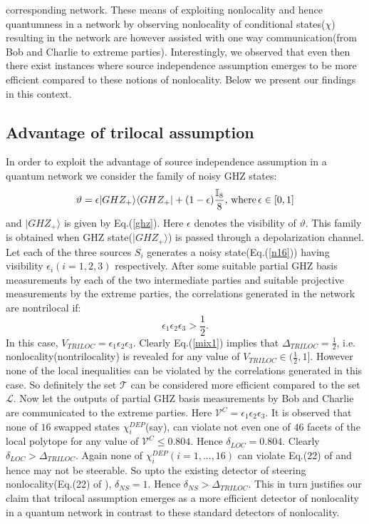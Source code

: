 \documentclass[pra,10pt,twocolumn,superscriptaddress,floatfix,showpacs]{revtex4-1}
\begin{document}
corresponding network. These means of exploiting nonlocality and hence quantumness in a network by observing nonlocality of conditional states($\chi$) resulting in the network are however assisted with one way communication(from Bob and Charlie to extreme parties). Interestingly, we observed that even then there  exist instances where source independence assumption emerges to be more efficient compared to these notions of nonlocality. Below we present our findings in this context.
\subsection{Advantage of trilocal assumption}
In order to exploit the advantage of source independence assumption in a quantum network we consider the family of noisy GHZ states:
\begin{equation}\label{n16}
\vartheta=\epsilon  |GHZ_+\rangle\langle GHZ_+|+(1-\epsilon)\frac{\mathbb{I}_8}{8},\,\textmd{where}\,\epsilon\in[0,1]
\end{equation}
and $|GHZ_+\rangle$ is given by Eq.(\ref{ghz}). Here $\epsilon$ denotes the visibility of $\vartheta$.
This family is obtained when GHZ state($|GHZ_+\rangle$) is passed through a depolarization channel\cite{NIE,BEN,BNN,BRS}. Let each of the three sources $S_i$ generates a noisy state(Eq.(\ref{n16})) having visibility $\epsilon_i(i=1,2,3)$ respectively. After some suitable partial GHZ basis measurements by each of the two intermediate parties and suitable projective measurements by the extreme parties, the correlations generated in the  network are nontrilocal if:
 \begin{equation}\label{mix1}
    \epsilon_1\epsilon_2\epsilon_3>\frac{1}{2}.
 \end{equation}
 In this case, $V_{TRILOC}= \epsilon_1\epsilon_2\epsilon_3$. Clearly Eq.(\ref{mix1}) implies that $\Delta_{TRILOC}=\frac{1}{2}$, i.e. nonlocality(nontrilocality) is revealed for any value of  $V_{TRILOC}\in(\frac{1}{2},1]$. However none of the local inequalities can be violated by the correlations generated in this case. So definitely the set $\mathcal{T}$ can be considered more efficient compared to the set $\mathcal{L}.$ Now let the outputs of partial GHZ basis measurements by Bob and Charlie are communicated to the extreme parties. Here $\mathcal{V}^C=\epsilon_1\epsilon_2\epsilon_3$. It is observed that none of  $16$ swapped states $\chi_i^{DEP}$(say), can violate\cite{info} not even one of $46$ facets of the local polytope\cite{Sliwa} for any  value of $\mathcal{V}^C\leq 0.804$. Hence $\delta_{LOC}=0.804$. Clearly $\delta_{LOC}>\Delta_{TRILOC}$. Again none of $\chi_i^{DEP}(i=1,...,16)$ can violate Eq.(22) of \cite{caval1} and hence may not be steerable. So upto the existing detector of steering nonlocality(Eq.(22) of \cite{caval1}), $\delta_{NS}=1.$ Hence $\delta_{NS}>\Delta_{TRILOC}.$ This in turn justifies our claim that trilocal assumption emerges as a more efficient detector of nonlocality in a quantum network in contrast to these standard detectors of nonlocality.\\
\end{document}
